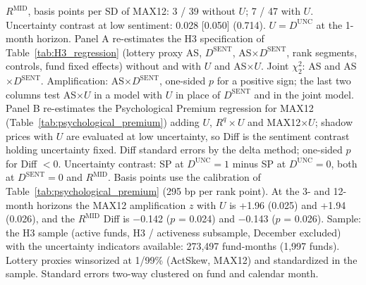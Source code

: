 \begin{table}[!htbp]
\begin{minipage}{\tabletempwidth}
\captionsetup{width=\linewidth}
\caption{H3 and the Psychological Premium With Macroeconomic Uncertainty}\label{tab:unc_H3}
\ifdim\wd\tabletempbox>\linewidth
  \resizebox{\linewidth}{!}{\usebox{\tabletempbox}}
\else
  \usebox{\tabletempbox}
\fi
\par\medskip
\begin{singlespace}\tablefont\noindent
$R^{\text{MID}}$, basis points per SD of MAX12: 3 / 39 without $U$; 7 / 47 with $U$. Uncertainty contrast at low sentiment: 0.028 [0.050] (0.714). $U=D^{\text{UNC}}$ at the 1-month horizon. Panel A re-estimates the H3 specification of Table~\ref{tab:H3_regression} (lottery proxy AS, $D^{\text{SENT}}$, AS$\times D^{\text{SENT}}$, rank segments, controls, fund fixed effects) without and with $U$ and AS$\times U$. Joint $\chi^2_2$: AS and AS$\times D^{\text{SENT}}$. Amplification: AS$\times D^{\text{SENT}}$, one-sided $p$ for a positive sign; the last two columns test AS$\times U$ in a model with $U$ in place of $D^{\text{SENT}}$ and in the joint model. Panel B re-estimates the Psychological Premium regression for MAX12 (Table~\ref{tab:psychological_premium}) adding $U$, $R^q\times U$ and MAX12$\times U$; shadow prices with $U$ are evaluated at low uncertainty, so Diff is the sentiment contrast holding uncertainty fixed. Diff standard errors by the delta method; one-sided $p$ for Diff $<0$. Uncertainty contrast: SP at $D^{\text{UNC}}=1$ minus SP at $D^{\text{UNC}}=0$, both at $D^{\text{SENT}}=0$ and $R^{\text{MID}}$. Basis points use the calibration of Table~\ref{tab:psychological_premium} (295 bp per rank point). At the 3- and 12-month horizons the MAX12 amplification $z$ with $U$ is +1.96 (0.025) and +1.94 (0.026), and the $R^{\text{MID}}$ Diff is $-$0.142 ($p$ = 0.024) and $-$0.143 ($p$ = 0.026). Sample: the H3 sample (active funds, H3 / activeness subsample, December excluded) with the uncertainty indicators available: 273,497 fund-months (1,997 funds). Lottery proxies winsorized at 1/99\% (ActSkew, MAX12) and standardized in the sample. Standard errors two-way clustered on fund and calendar month.
\end{singlespace}
\end{minipage}
\end{table}

